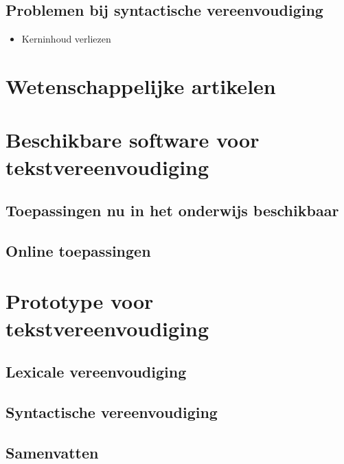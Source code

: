 \subsection{Problemen bij syntactische vereenvoudiging}

\begin{itemize}
	\item Kerninhoud verliezen
\end{itemize}

\section{Wetenschappelijke artikelen}


\section{Beschikbare software voor tekstvereenvoudiging}

\subsection{Toepassingen nu in het onderwijs beschikbaar}

\subsection{Online toepassingen}

\section{Prototype voor tekstvereenvoudiging}


\subsection{Lexicale vereenvoudiging}

\subsection{Syntactische vereenvoudiging}

\subsection{Samenvatten}

